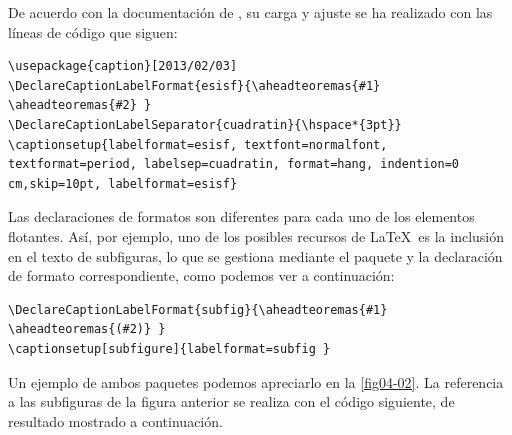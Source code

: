 De acuerdo con la documentación de , su carga y ajuste se ha realizado con las líneas de código que siguen:

\begin{lstlisting}[frame=none]
\usepackage{caption}[2013/02/03]
\DeclareCaptionLabelFormat{esisf}{\aheadteoremas{#1} \aheadteoremas{#2} }
\DeclareCaptionLabelSeparator{cuadratin}{\hspace*{3pt}}
\captionsetup{labelformat=esisf, textfont=normalfont, textformat=period, labelsep=cuadratin, format=hang, indention=0 cm,skip=10pt, labelformat=esisf}
\end{lstlisting}

Las declaraciones de formatos son diferentes para cada uno de los elementos flotantes. Así, por ejemplo, uno de los posibles recursos de \LaTeX\ es la inclusión en el texto de subfiguras, lo que se gestiona mediante el paquete  y la declaración de formato correspondiente, como podemos ver a continuación:

\begin{lstlisting}[frame=none]
\DeclareCaptionLabelFormat{subfig}{\aheadteoremas{#1} \aheadteoremas{(#2)} }
\captionsetup[subfigure]{labelformat=subfig }
\end{lstlisting}

Un ejemplo de ambos paquetes podemos apreciarlo en la \autoref{fig04-02}. La referencia a las subfiguras de la figura anterior se realiza con el código siguiente, de resultado mostrado a continuación. 

